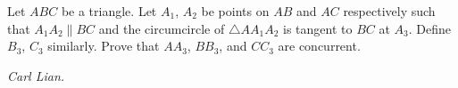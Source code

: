 Let $ABC$ be a triangle. Let $A_1$, $A_2$ be points on $AB$ and $AC$ respectively such that $A_1A_2 \parallel BC$ and the circumcircle of $\triangle AA_1A_2$ is tangent to $BC$ at $A_3$. Define $B_3$, $C_3$ similarly. Prove that $AA_3$, $BB_3$, and $CC_3$ are concurrent.

\textit{Carl Lian.}